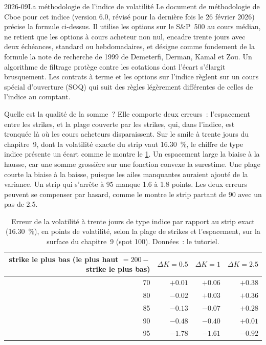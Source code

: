 \begin{dated}{2026-09}{La méthodologie de l'indice de volatilité}\label{dat:dv:variance-swaps-and-volatility-derivatives:vix}
Le document de méthodologie de Cboe pour cet indice (version 6.0, révisé pour la dernière fois le 26 février 2026) précise la formule ci-dessus.
Il utilise les options sur le S\&P~500 au cours médian, ne retient que les options à cours acheteur non nul, encadre trente jours avec deux
échéances, standard ou hebdomadaires, et désigne comme fondement de la formule la note de recherche de 1999 de Demeterfi, Derman,
Kamal et Zou. Un algorithme de filtrage protège contre les cotations dont l'écart s'élargit brusquement. Les contrats à terme et les options sur
l'indice règlent sur un cours spécial d'ouverture (SOQ) qui suit des règles légèrement différentes de celles de l'indice au comptant.
\end{dated}

Quelle est la qualité de la somme~? Elle comporte deux erreurs~: l'espacement entre les strikes, et la plage couverte par les strikes, qui, dans
l'indice, est tronquée là où les cours acheteurs disparaissent. Sur le smile à trente jours du chapitre~9, dont la volatilité exacte du strip vaut 16.30~\%,
le chiffre de type indice présente un écart comme le montre le \cref{tab:dv:variance-swaps-and-volatility-derivatives:errors}. Un espacement large
la biaise à la hausse, car une somme grossière sur une fonction convexe la surestime. Une plage courte la biaise à la baisse, puisque les
ailes manquantes auraient ajouté de la variance. Un strip qui s'arrête à 95 manque 1.6 à 1.8 points. Les deux erreurs peuvent
se compenser par hasard, comme le montre le strip partant de 90 avec un pas de 2.5.

\begin{table}[ht]
\centering
\begin{tabular}{rrrr}
\toprule
strike le plus bas (le plus haut $=200-$ strike le plus bas) & $\Delta K=0.5$ & $\Delta K=1$ & $\Delta K=2.5$\\
\midrule
70 & $+0.01$ & $+0.06$ & $+0.38$\\
80 & $-0.02$ & $+0.03$ & $+0.36$\\
85 & $-0.13$ & $-0.07$ & $+0.28$\\
90 & $-0.48$ & $-0.40$ & $+0.01$\\
95 & $-1.78$ & $-1.61$ & $-0.92$\\
\bottomrule
\end{tabular}
\caption{Erreur de la volatilité à trente jours de type indice par rapport au strip exact (16.30~\%), en points de volatilité,
selon la plage de strikes et l'espacement, sur la surface du chapitre~9 (spot 100). Données~: le tutoriel.}\label{tab:dv:variance-swaps-and-volatility-derivatives:errors}
\end{table}

